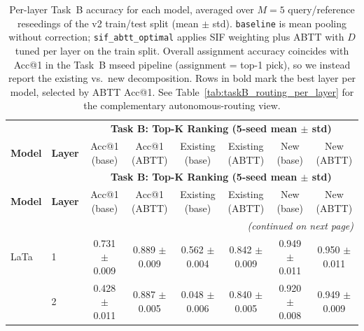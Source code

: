 \begingroup
\small
\setlength{\tabcolsep}{4pt}
\begin{longtable}{llcccccc}
\caption{Per-layer Task~B accuracy for each model, averaged over $M=5$ query/reference reseedings of the v2 train/test split (mean $\pm$ std). \texttt{baseline} is mean pooling without correction; \texttt{sif\_abtt\_optimal} applies SIF weighting plus ABTT with $D$ tuned per layer on the train split. Overall assignment accuracy coincides with Acc@1 in the Task~B mseed pipeline (assignment = top-1 pick), so we instead report the existing vs.\ new decomposition. Rows in bold mark the best layer per model, selected by ABTT Acc@1. See Table~\ref{tab:taskB_routing_per_layer} for the complementary autonomous-routing view.}
\label{tab:taskB_per_layer} \\
\toprule
\multicolumn{2}{c}{} & \multicolumn{6}{c}{\textbf{Task B: Top-K Ranking (5-seed mean $\pm$ std)}} \\
\cmidrule(lr){3-8}
\textbf{Model} & \textbf{Layer} & \makecell{Acc@1\\(base)} & \makecell{Acc@1\\(ABTT)} & \makecell{Existing\\(base)} & \makecell{Existing\\(ABTT)} & \makecell{New\\(base)} & \makecell{New\\(ABTT)} \\
\midrule
\endfirsthead
\toprule
\multicolumn{2}{c}{} & \multicolumn{6}{c}{\textbf{Task B: Top-K Ranking (5-seed mean $\pm$ std)}} \\
\cmidrule(lr){3-8}
\textbf{Model} & \textbf{Layer} & \makecell{Acc@1\\(base)} & \makecell{Acc@1\\(ABTT)} & \makecell{Existing\\(base)} & \makecell{Existing\\(ABTT)} & \makecell{New\\(base)} & \makecell{New\\(ABTT)} \\
\midrule
\endhead
\midrule
\multicolumn{8}{r}{\textit{(continued on next page)}} \\
\endfoot
\bottomrule
\endlastfoot
LaTa & 1 & 0.731 $\pm$ 0.009 & 0.889 $\pm$ 0.009 & 0.562 $\pm$ 0.004 & 0.842 $\pm$ 0.009 & 0.949 $\pm$ 0.011 & 0.950 $\pm$ 0.011 \\
 & 2 & 0.428 $\pm$ 0.011 & 0.887 $\pm$ 0.005 & 0.048 $\pm$ 0.006 & 0.840 $\pm$ 0.005 & 0.920 $\pm$ 0.008 & 0.949 $\pm$ 0.009 \\

\end{longtable}
